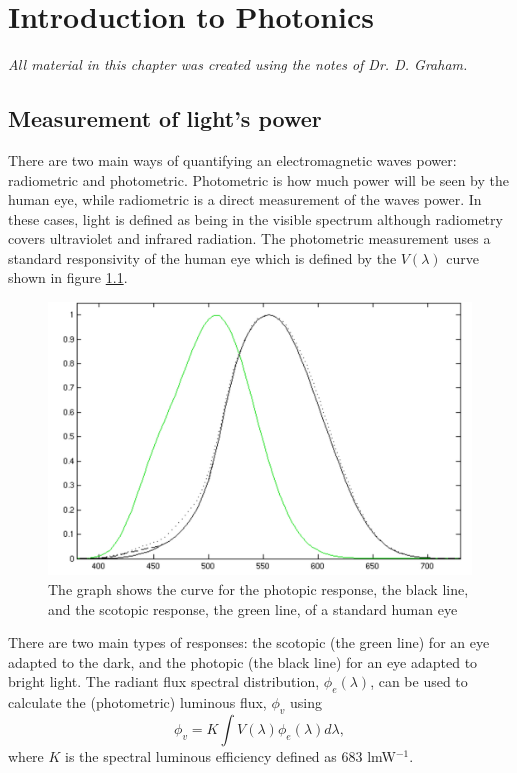 \chapter{Introduction to Photonics}
\minitoc
\textit{All material in this chapter was created using the notes of Dr. D. Graham.}
\pagebreak

\section{Measurement of light's power}

There are two main ways of quantifying an electromagnetic waves power: radiometric and photometric.
Photometric is how much power will be seen by the human eye, while radiometric is a direct measurement of the waves power.
In these cases, light is defined as being in the visible spectrum although radiometry covers ultraviolet and infrared radiation.
The photometric measurement uses a standard responsivity of the human eye which is defined by the $V(\lambda)$ curve shown in figure \ref{fig:ItP:eye}.
\begin{figure}[H]
	\includegraphics[width=\linewidth]{Photonics/eye}
	\caption{The graph shows the curve for the photopic response, the black line, and the scotopic response, the green line, of a standard human eye}
	\label{fig:ItP:eye}
\end{figure}
%
There are two main types of responses: the scotopic (the green line) for an eye adapted to the dark, and the photopic (the black line) for an eye adapted to bright light.
 The radiant flux spectral distribution, $\phi_e(\lambda)$, can be used to calculate the (photometric) luminous flux, $\phi_v$ using
%
\begin{equation}
	\phi_v = K\int{V(\lambda)\phi_e(\lambda)d\lambda},
	\label{eq:ItP:luminous}
\end{equation}
%
where $K$ is the spectral luminous efficiency defined as $683$ lmW$^{-1}$.
